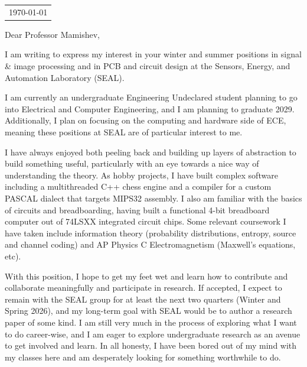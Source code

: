 \documentclass[letterpaper,12pt]{article}
\begin{document}
\begin{minipage}[c]{1\textwidth}
    \raggedleft
    \begin{tabular}{r}
        \today
    \end{tabular}
\end{minipage}

\noindent Dear Professor Mamishev,


I am writing to express my interest in your winter and summer positions in signal \& image processing and in PCB and circuit design at the Sensors, Energy, and Automation Laboratory (SEAL).

I am currently an undergraduate Engineering Undeclared student planning to go into Electrical and Computer Engineering, and I am planning to graduate 2029. Additionally, I plan on focusing on the computing and hardware side of ECE, meaning these positions at SEAL are of particular interest to me.

I have always enjoyed both peeling back and building up layers of abstraction to build something useful, particularly with an eye towards a nice way of understanding the theory. As hobby projects, I have built complex software including a multithreaded C++ chess engine and a compiler for a custom PASCAL dialect that targets MIPS32 assembly. I also am familiar with the basics of circuits and breadboarding, having built a functional 4-bit breadboard computer out of 74LSXX integrated circuit chips. Some relevant coursework I have taken include information theory (probability distributions, entropy, source and channel coding) and AP Physics C Electromagnetism (Maxwell's equations, etc).

With this position, I hope to get my feet wet and learn how to contribute and collaborate meaningfully and participate in research. If accepted, I expect to remain with the SEAL group for at least the next two quarters (Winter and Spring 2026), and my long-term goal with SEAL would be to author a research paper of some kind. I am still very much in the process of exploring what I want to do career-wise, and I am eager to explore undergraduate research as an avenue to get involved and learn. In all honesty, I have been bored out of my mind with my classes here and am desperately looking for something worthwhile to do.
\end{document}
